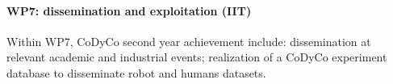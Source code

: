 

\paragraph*{WP7: dissemination and exploitation (IIT)}

Within WP7, CoDyCo second year achievement include: dissemination at relevant academic and industrial events; realization of a CoDyCo experiment database to disseminate robot and humans datasets. 